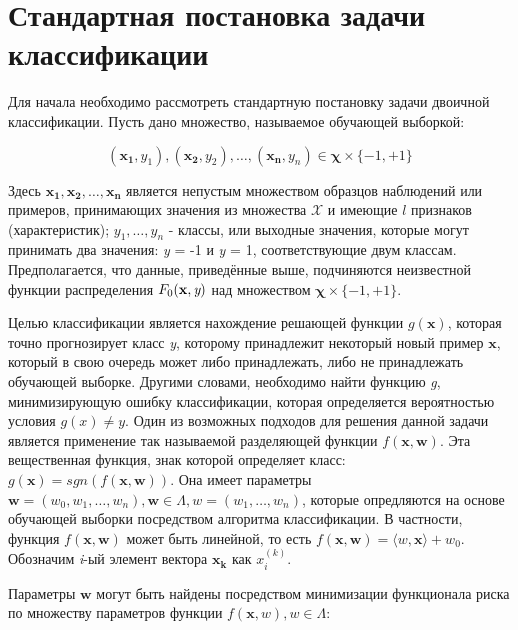 \documentclass[12pt,a4paper,oneside]{article}
\begin{document}
\section{Стандартная постановка задачи классификации}
\label{sec:standard_classification_problem}

\par
Для начала необходимо рассмотреть стандартную постановку задачи двоичной классификации.
Пусть дано множество, называемое обучающей выборкой:

\[
(\mathbf{x_1}, y_1),(\mathbf{x_2}, y_2), \dots, (\mathbf{x_n}, y_n) \in \mathbf{\chi} \times \{-1,+1\}
\]

\par
Здесь \(\mathbf{x_1}, \mathbf{x_2}, \dots, \mathbf{x_n}\) является непустым множеством образцов наблюдений или примеров, принимающих значения из множества \(\mathcal{X}\) и имеющие $l$ признаков (характеристик); \(y_1, \dots, y_n\) - классы, или выходные значения, которые могут принимать два значения: \emph{y} = -1 и \emph{y} = 1, соответствующие двум классам. 
Предполагается, что данные, приведённые выше, подчиняются неизвестной функции распределения \(F_0(\mathbf{x}, \emph{y})\) над множеством \(\mathbf{\chi} \times \{-1, +1\}\). 

\par
Целью классификации является нахождение решающей функции \(g(\mathbf{x})\), которая точно прогнозирует класс \emph{y}, которому принадлежит некоторый новый пример \(\mathbf{x}\), который в свою очередь может либо принадлежать, либо не принадлежать обучающей выборке. 
Другими словами, необходимо найти функцию \emph{g}, минимизирующую ошибку классификации, которая определяется вероятностью условия \(g(x) \neq y\). 
Один из возможных подходов для решения данной задачи является применение так называемой разделяющей функции \(f(\mathbf{x}, \mathbf{w})\). 
Эта вещественная функция, знак которой определяет класс: \(g(\mathbf{x})=sgn(f(\mathbf{x}, \mathbf{w}))\).
Она имеет параметры \(\mathbf{w}=(w_0, w_1, \dots, w_n), \mathbf{w} \in \Lambda, w = (w_1, \dots, w_n)\), которые опредляются на основе обучающей выборки посредством алгоритма классификации. 
В частности, функция \(f(\mathbf{x}, \mathbf{w})\) может быть линейной, то есть \(f(\mathbf{x}, \mathbf{w}) = \langle w, \mathbf{x} \rangle + w_0\). 
Обозначим \emph{i}-ый элемент вектора \(\mathbf{x_k}\) как \(x_i^{(k)}\). 

\par
Параметры \(\mathbf{w}\) могут быть найдены посредством минимизации функционала риска по множеству параметров функции \(f(\mathbf{x}, w), w \in \Lambda\):
\end{document}
